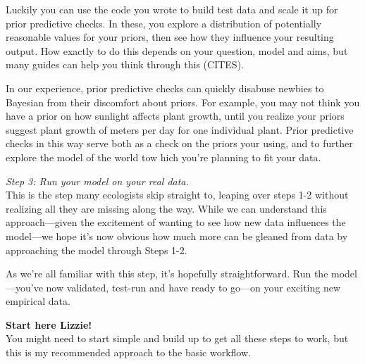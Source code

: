 \documentclass[11pt]{article}
\begin{document}
Luckily you can use the code you wrote to build test data and scale it up for prior predictive checks. In these, you explore a distribution of potentially reasonable values for your priors, then see how they influence your resulting output. How exactly to do this depends on your question, model and aims, but many guides can help you think through this (CITES). 

In our experience, prior predictive checks can quickly disabuse newbies to Bayesian from their discomfort about priors. For example, you may not think you have a prior on how sunlight affects plant growth, until you realize your priors suggest plant growth of meters per day for one individual plant. Prior predictive checks in this way serve both as a check on the priors your using, and to further explore the model of the world tow hich you're planning to fit your data. 
 
 \emph{Step 3: Run your model on your real data.} \\
This is the step many ecologists skip straight to, leaping over steps 1-2 without realizing all they are missing along the way. While we can understand this approach---given the excitement of wanting to see how new data influences the model---we hope it's now obvious how much more can be gleaned from data by approaching the model through Steps 1-2. 

As we're all familiar with this step, it's hopefully straightforward. Run the model---you've now validated, test-run and have ready to go---on your exciting new empirical data. 

{\Large \bf Start here Lizzie!} \\


You might need to start simple and build up to get all these steps to work, but this is my recommended approach to the basic workflow.
\end{document}
